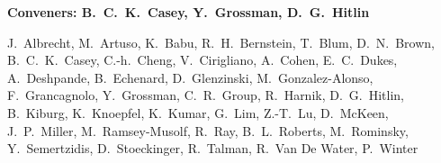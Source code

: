 

\begin{center}

\begin{large} {\bf Conveners: B.~C.~K.~Casey, Y.~Grossman, D.~G.~Hitlin} \end{large}

J.~Albrecht,
M.~Artuso,
K.~Babu,
R.~H.~Bernstein,
T.~Blum,
D.~N.~Brown,
B.~C.~K.~Casey,
C.-h.~Cheng,
V.~Cirigliano,
A.~Cohen,
E.~C.~Dukes,
A.~Deshpande,
B.~Echenard,
D.~Glenzinski,
M.~Gonzalez-Alonso,
F.~Grancagnolo,
Y.~Grossman,
C.~R.~Group,
R.~Harnik,
D.~G.~Hitlin, 
B.~Kiburg,
K.~Knoepfel,
K.~Kumar,
G.~Lim,
Z.-T.~Lu,
D.~McKeen,
J.~P.~Miller,
M.~Ramsey-Musolf,
R.~Ray,
B.~L.~Roberts,
M.~Rominsky,
Y.~Semertzidis,
D.~Stoeckinger,
R.~Talman,
R.~Van De Water,
P.~Winter 


\end{center}

